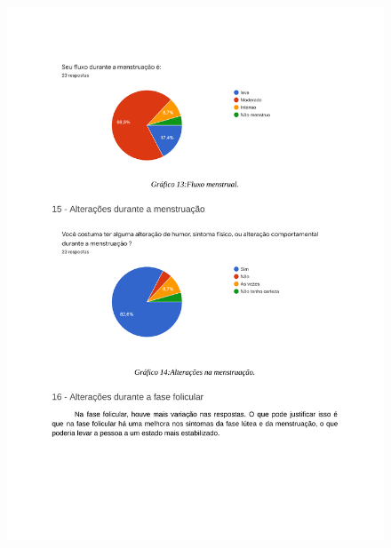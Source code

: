 \begin{apendicesenv}
    \begin{figure}[h]
        \centering
        \includegraphics[keepaspectratio=true,scale=0.7]{figuras/Tab12.pdf}
    \end{figure}
    

\end{apendicesenv}
